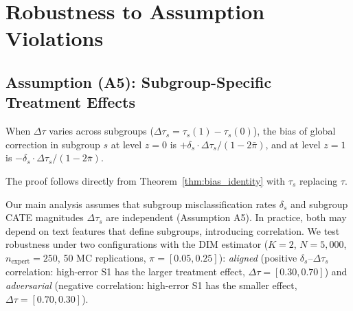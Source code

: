 \section{Robustness to Assumption Violations}
\label{app:a5_violation}

\subsection{Assumption (A5): Subgroup-Specific Treatment Effects}

\begin{corollary}
\label{cor:a5_relaxation}
When $\Delta\tau$ varies across subgroups ($\Delta\tau_s = \tau_s(1) - \tau_s(0)$), the bias of global correction in subgroup $s$ at level $z{=}0$ is $+\delta_s \cdot \Delta\tau_s / (1 - 2\bar{\pi})$, and at level $z{=}1$ is $-\delta_s \cdot \Delta\tau_s / (1 - 2\bar{\pi})$.
\end{corollary}
The proof follows directly from Theorem~\ref{thm:bias_identity} with $\tau_s$ replacing $\tau$.

Our main analysis assumes that subgroup misclassification rates $\delta_s$ and subgroup CATE magnitudes $\Delta\tau_s$ are independent (Assumption A5).
In practice, both may depend on text features that define subgroups, introducing correlation.
We test robustness under two configurations with the DIM estimator ($K{=}2$, $N{=}5{,}000$, $n_{\text{expert}}{=}250$, 50 MC replications, $\pi = [0.05, 0.25]$):
\emph{aligned} (positive $\delta_s$--$\Delta\tau_s$ correlation: high-error S1 has the larger treatment effect, $\Delta\tau = [0.30, 0.70]$) and
\emph{adversarial} (negative correlation: high-error S1 has the smaller effect, $\Delta\tau = [0.70, 0.30]$).

\begin{table}[h]
\centering
\caption{Coverage and $|\text{bias}|$ under A5 violation ($K{=}2$, $n_{\text{expert}}{=}250$, 50 MC). Target coverage: 0.95.}
\label{tab:a5_violation}
\small
{}
\end{table}

